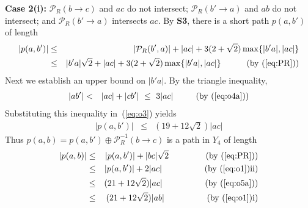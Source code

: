\pdfoutput=1  \documentclass[11pt]{article}
\newcommand{\Pa}{{\mathcal P}}
\begin{document}
\medskip
\noindent
{\bf Case 2(i):}
$\Pa_R(b \rightarrow c)$ and $ac$ do not intersect;
$\Pa_R(b' \rightarrow a)$ and $ab$ do not intersect;
and $\Pa_R(b' \rightarrow a)$ intersects $ac$.
By {\bf S3}, there is a short path $p(a,b')$ of length
\begin{eqnarray}
\nonumber |p(a,b')| & \le & |\Pa_R(b',a)| + |ac| + 3(2+\sqrt{2}) \max\{|b'a|, |ac|\} \\
           & \le & |b'a|\sqrt{2} + |ac| + 3(2+\sqrt{2}) \max\{|b'a|, |ac|\} ~~~~~~~~~\mbox{(by~(\ref{eq:PR}))}
\label{eq:o3}
\end{eqnarray}
Next we establish an upper bound on $|b'a|$. By the triangle inequality,
\begin{eqnarray}
          |ab'| & < & |ac| + |cb'| ~\le ~3|ac| ~~~~~~~~\mbox{(by~(\ref{eq:o4a}))}
\label{eq:o4b}
\end{eqnarray}
Substituting this inequality in~(\ref{eq:o3}) yields
\begin{eqnarray}
|p(a,b')| & \le & (19+12\sqrt{2})|ac|
\label{eq:o5a}
\end{eqnarray}
Thus $p(a,b) = p(a,b') \oplus \Pa_R^{-1}(b \rightarrow c)$ is a path in $Y_4$ of length
\begin{eqnarray*}
        |p(a,b)| & \le & |p(a,b')| + |bc| \sqrt{2} ~~~~~~~~~~~~~\mbox{(by~(\ref{eq:PR}))}\\
                   & \le & |p(a,b')| + 2|ac|  ~~~~~~~~~~~~~~~\mbox{(by~(\ref{eq:o1})ii)} \\
                   & \le & (21+12\sqrt{2})|ac| ~~~~~~~~~~~~~~~\mbox{(by~(\ref{eq:o5a}))} \\
                   & \le & (21+12\sqrt{2})|ab| ~~~~~~~~~~~~~~~\mbox{(by~(\ref{eq:o1})i)} \\
\end{eqnarray*}
\end{document}
